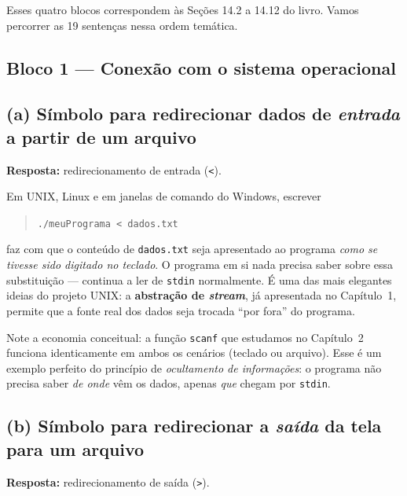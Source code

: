 \documentclass[11pt,a4paper]{article}
\begin{document}
Esses quatro blocos correspondem \`as Se\c{c}\~oes 14.2 a 14.12 do livro. Vamos percorrer as 19 senten\c{c}as nessa ordem tem\'atica.

\subsection*{Bloco 1 --- Conex\~ao com o sistema operacional}

\subsection*{(a) S\'imbolo para redirecionar dados de \emph{entrada} a partir de um arquivo}

\begin{resposta}\textbf{Resposta:} redirecionamento de entrada (\texttt{<}).\end{resposta}

Em UNIX, Linux e em janelas de comando do Windows, escrever
\begin{quote}\texttt{./meuPrograma < dados.txt}\end{quote}
faz com que o conte\'udo de \texttt{dados.txt} seja apresentado ao programa \emph{como se tivesse sido digitado no teclado}. O programa em si nada precisa saber sobre essa substitui\c{c}\~ao --- continua a ler de \texttt{stdin} normalmente. \'E uma das mais elegantes ideias do projeto UNIX: a \textbf{abstra\c{c}\~ao de \emph{stream}}, j\'a apresentada no Cap\'itulo~1, permite que a fonte real dos dados seja trocada ``por fora'' do programa.

\begin{obseng}
Note a economia conceitual: a fun\c{c}\~ao \texttt{scanf} que estudamos no Cap\'itulo~2 funciona identicamente em ambos os cen\'arios (teclado ou arquivo). Esse \'e um exemplo perfeito do princ\'ipio de \emph{ocultamento de informa\c{c}\~oes}: o programa n\~ao precisa saber \emph{de onde} v\^em os dados, apenas \emph{que} chegam por \texttt{stdin}.
\end{obseng}

\subsection*{(b) S\'imbolo para redirecionar a \emph{sa\'ida} da tela para um arquivo}

\begin{resposta}\textbf{Resposta:} redirecionamento de sa\'ida (\texttt{>}).\end{resposta}
\end{document}
